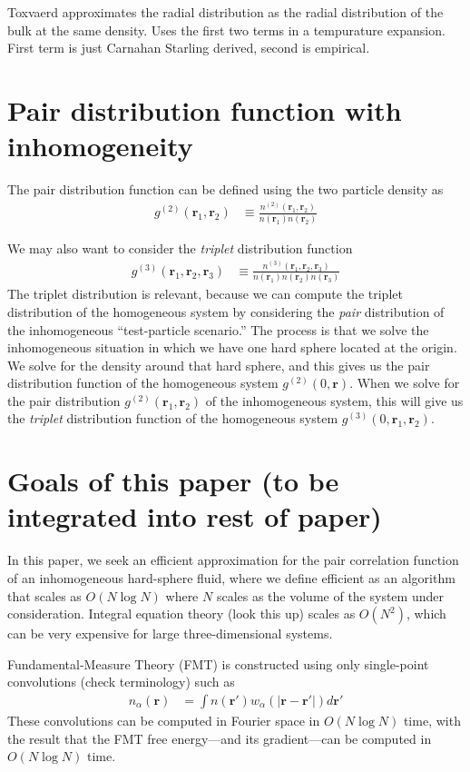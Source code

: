 \documentclass[letterpaper,twocolumn,amsmath,amssymb,pre,aps,10pt]{revtex4-1}
\newcommand{\rr}{\textbf{r}}
\begin{document}
Toxvaerd \cite{toxvaerd1976hydrostatic}approximates the radial
distribution as the radial distribution of the bulk at the same
density.  Uses the first two terms in a tempurature expansion.  First
term is just Carnahan Starling derived, second is empirical.


\section{Pair distribution function with inhomogeneity}

The pair distribution function can be defined using the two particle
density as
\begin{align}
  g^{(2)}(\rr_1,\rr_2) &\equiv \frac{n^{(2)}(\rr_1,\rr_2)}{n(\rr_1)n(\rr_2)}
\end{align}

We may also want to consider the \emph{triplet} distribution function
\begin{align}
  g^{(3)}(\rr_1,\rr_2,\rr_3) &\equiv \frac{n^{(3)}(\rr_1,\rr_2,\rr_3)}{n(\rr_1)n(\rr_2)n(\rr_3)}
\end{align}
The triplet distribution is relevant, because we can compute the
triplet distribution of the homogeneous system by considering the
\emph{pair} distribution of the inhomogeneous ``test-particle
scenario.''  The process is that we solve the inhomogeneous situation
in which we have one hard sphere located at the origin.  We solve for
the density around that hard sphere, and this gives us the pair
distribution function of the homogeneous system $g^{(2)}(0, \rr)$.
When we solve for the pair distribution $g^{(2)}(\rr_1,\rr_2)$ of the
inhomogeneous system, this will give us the \emph{triplet}
distribution function of the homogeneous system
$g^{(3)}(0,\rr_1,\rr_2)$.

\section{Goals of this paper (to be integrated into rest of paper)}


In this paper, we seek an efficient approximation for the pair
correlation function of an inhomogeneous hard-sphere fluid, where we
define efficient as an algorithm that scales as $O(N\log N)$ where $N$
scales as the volume of the system under consideration.
Integral equation theory (look this up) scales as $O(N^2)$, which can
be very expensive for large three-dimensional systems.

Fundamental-Measure Theory (FMT) is constructed using only single-point
convolutions (check terminology) such as
\begin{align}
  n_\alpha(\rr) &= \int n(\rr')w_\alpha(|\rr-\rr'|) d\rr'
\end{align}
These convolutions can be computed in Fourier space in $O(N\log N)$
time, with the result that the FMT free energy---and its
gradient---can be computed in $O(N\log N)$ time.
\end{document}
